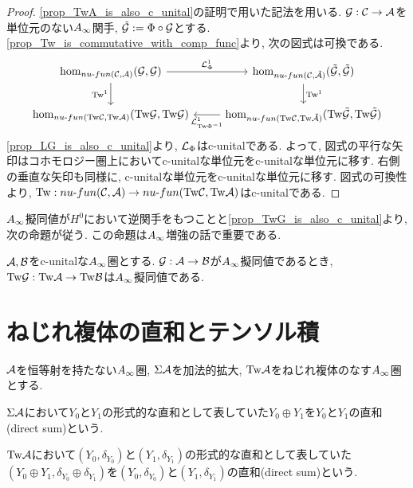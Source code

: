 \documentclass[uplatex, a4paper, 14Q, dvipdfmx]{jsarticle}
\begin{document}
\begin{proof}
  \cref{prop_TwA_is_also_c_unital}の証明で用いた記法を用いる.
  $\mathcal{G} : \mathcal{C} \to \mathcal{A}$を単位元のない$A_{\infty}$関手, $\tilde{\mathcal{G}} := \Phi \circ \mathcal{G}$とする. 
  \cref{prop_Tw_is_commutative_with_comp_func}より, 次の図式は可換である. 
  \[\begin{tikzcd}
    {\hom_{\nufun{\C}{\A}}(\G,\G)} & {\hom_{\nufun{\C}{\tilA}}(\tilG,\tilG)} \\
    {\hom_{\nufun{\Tw\C}{\Tw\A}}(\Tw\G,\Tw\G)} & {\hom_{\nufun{\Tw\C}{\Tw\tilA}}(\Tw\tilG,\Tw\tilG)}
    \arrow["{\L^1_\Phi}", from=1-1, to=1-2]
    \arrow["{\Tw^1}", from=1-2, to=2-2]
    \arrow["{\L^1_{\Tw\Phi^{-1}}}", from=2-2, to=2-1]
    \arrow["{\Tw^1}"', from=1-1, to=2-1]
  \end{tikzcd}\]
  \cref{prop_LG_is_also_c_unital}より, $\mathcal{L}_\Phi$はc-unitalである.
  よって, 図式の平行な矢印はコホモロジー圏上においてc-unitalな単位元をc-unitalな単位元に移す.
  右側の垂直な矢印も同様に, c-unitalな単位元をc-unitalな単位元に移す.
  図式の可換性より, $\mathrm{Tw} : nu \text{-} fun (\mathcal{C}, \mathcal{A}) \to nu \text{-} fun (\mathrm{Tw}\mathcal{C}, \mathrm{Tw}\mathcal{A})$はc-unitalである.
\end{proof}

$A_{\infty}$擬同値が$H^0$において逆関手をもつことと\cref{prop_TwG_is_also_c_unital}より, 次の命題が従う.
この命題は$A_{\infty}$増強の話で重要である.

\begin{lemma} \label{prop_Tw_is_Ainf_qeq}
  $\mathcal{A},\mathcal{B}$をc-unitalな$A_{\infty}$圏とする.
  $\mathcal{G} : \mathcal{A} \to \mathcal{B}$が$A_{\infty}$擬同値であるとき, $\mathrm{Tw}\mathcal{G} : \mathrm{Tw}\mathcal{A} \to \mathrm{Tw}\mathcal{B}$は$A_{\infty}$擬同値である.
\end{lemma}

\section{ねじれ複体の直和とテンソル積}

$\mathcal{A}$を恒等射を持たない$A_{\infty}$圏, $\Sigma\mathcal{A}$を加法的拡大, $\mathrm{Tw}\mathcal{A}$をねじれ複体のなす$A_{\infty}$圏とする. 

\begin{definition}[加法的拡大とねじれ複体の直和]
  $\Sigma\mathcal{A}$において$Y_0$と$Y_1$の形式的な直和として表していた$Y_0 \oplus Y_1$を$Y_0$と$Y_1$の直和(direct sum)という.
\end{definition}

\begin{definition}[ねじれ複体の直和]
  $\mathrm{Tw}\mathcal{A}$において$(Y_0,\delta_{Y_0})$と$(Y_1,\delta_{Y_1})$の形式的な直和として表していた$(Y_0 \oplus Y_1, \delta_{Y_0} \oplus \delta_{Y_1})$を$(Y_0,\delta_{Y_0})$と$(Y_1,\delta_{Y_1})$の直和(direct sum)という.
\end{definition}
\end{document}

